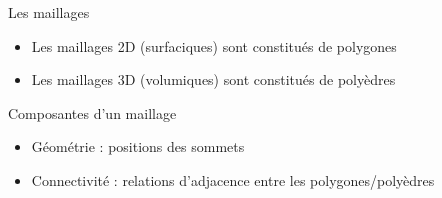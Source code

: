 \documentclass[9pt]{beamer}
\begin{document}
\begin{frame}
\begin{figure}[H]
\end{figure}
\small
\begin{block}{Les maillages}
\begin{itemize}
\item Les maillages 2D (surfaciques) sont constitués de polygones
\item Les maillages 3D (volumiques) sont constitués de polyèdres
\end{itemize}
\end{block}
\begin{block}{Composantes d'un maillage}
\begin{itemize}
\item Géométrie : positions des sommets
\item Connectivité : relations d’adjacence entre les polygones/polyèdres
\end{itemize}
\end{block}
\end{frame}
\end{document}
